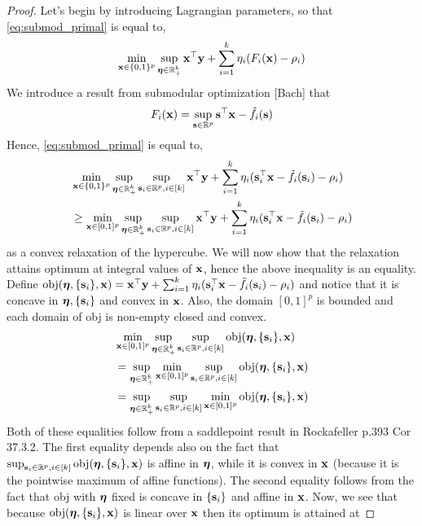 \begin{proof}
Let's begin by introducing Lagrangian parameters, so that \eqref{eq:submod_primal} is equal to,
\[
\min_{\mathbf{x} \in \{0,1\}^p} \sup_{\bm{\eta} \in \mathbb{R}_+^k}  \mathbf{x}^\top \mathbf{y} + \sum_{i = 1}^k \eta_i (F_i(\mathbf{x}) - \rho_i)
\]
We introduce a result from submodular optimization [Bach] that 
\[
F_i(\mathbf{x}) = \sup_{\mathbf{s} \in \mathbb{R}^p} \mathbf{s}^\top \mathbf{x} - \tilde f_i (\mathbf{s})
\]
Hence, \eqref{eq:submod_primal} is equal to,
\[
\begin{aligned}
&\min_{\mathbf{x} \in \{0,1\}^p} \sup_{\bm{\eta} \in \mathbb{R}_+^k} \sup_{\mathbf{s}_i \in \mathbb{R}^p, i \in [k]} \mathbf{x}^\top \mathbf{y} + \sum_{i = 1}^k \eta_i (\mathbf{s}_i^\top \mathbf{x} - \tilde f_i (\mathbf{s}_i) - \rho_i) \\
&\ge \min_{\mathbf{x} \in [0,1]^p} \sup_{\bm{\eta} \in \mathbb{R}_+^k} \sup_{\mathbf{s}_i \in \mathbb{R}^p, i \in [k]} \mathbf{x}^\top \mathbf{y} + \sum_{i = 1}^k \eta_i (\mathbf{s}_i^\top \mathbf{x} - \tilde f_i (\mathbf{s}_i) - \rho_i) \\
\end{aligned}
\]
as a convex relaxation of the hypercube.  We will now show that the relaxation attains optimum at integral values of $\mathbf{x}$, hence the above inequality is an equality.
Define $\textrm{obj}(\bm{\eta}, \{\mathbf{s}_i\}, \mathbf{x}) = \mathbf{x}^\top \mathbf{y} + \sum_{i = 1}^k \eta_i (\mathbf{s}_i^\top \mathbf{x} - \tilde f_i (\mathbf{s}_i) - \rho_i)$ and notice that it is concave in $\bm{\eta}, \{\mathbf{s}_i\}$ and convex in $\mathbf{x}$.
Also, the domain $[0,1]^p$ is bounded and each domain of obj is non-empty closed and convex.
\[
\begin{aligned}
&\min_{\mathbf{x} \in [0,1]^p} \sup_{\bm{\eta} \in \mathbb{R}_+^k} \sup_{\mathbf{s}_i \in \mathbb{R}^p, i \in [k]} \textrm{obj}(\bm{\eta}, \{\mathbf{s}_i\}, \mathbf{x}) \\
& = \sup_{\bm{\eta} \in \mathbb{R}_+^k} \min_{\mathbf{x} \in [0,1]^p} \sup_{\mathbf{s}_i \in \mathbb{R}^p, i \in [k]} \textrm{obj}(\bm{\eta}, \{\mathbf{s}_i\}, \mathbf{x}) \\
& = \sup_{\bm{\eta} \in \mathbb{R}_+^k} \sup_{\mathbf{s}_i \in \mathbb{R}^p, i \in [k]} \min_{\mathbf{x} \in [0,1]^p} \textrm{obj}(\bm{\eta}, \{\mathbf{s}_i\}, \mathbf{x}) \\
\end{aligned}
\]
Both of these equalities follow from a saddlepoint result in Rockafeller p.393 Cor 37.3.2.
The first equality depends also on the fact that $\sup_{\mathbf{s}_i \in \mathbb{R}^p, i \in [k]} \textrm{obj}(\bm{\eta}, \{\mathbf{s}_i\}, \mathbf{x})$ is affine in $\bm{\eta}$, while it is convex in $\mathbf{x}$ (because it is the pointwise maximum of affine functions).
The second equality follows from the fact that obj with $\bm{\eta}$ fixed is concave in $\{\mathbf{s}_i\}$ and affine in $\mathbf{x}$.
Now, we see that because $\textrm{obj}(\bm{\eta}, \{\mathbf{s}_i\}, \mathbf{x})$ is linear over $\mathbf{x}$ then its optimum is attained at

\end{proof}
